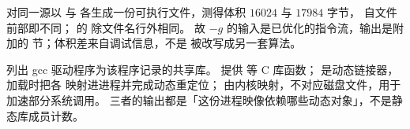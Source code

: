 对同一源以  与  各生成一份可执行文件，测得体积 $16024$ 与 $17984$ 字节， 自文件前部即不同；
 的  除文件名行外相同。
故 $-g$ 的输入是已优化的指令流，输出是附加的  节；体积差来自调试信息，不是  被改写成另一套算法。

 列出 gcc 驱动程序为该程序记录的共享库。
 提供  等 C 库函数；
 是动态链接器，加载时把各  映射进进程并完成动态重定位；
 由内核映射，不对应磁盘文件，用于加速部分系统调用。
三者的输出都是「这份进程映像依赖哪些动态对象」，不是静态库成员计数。
